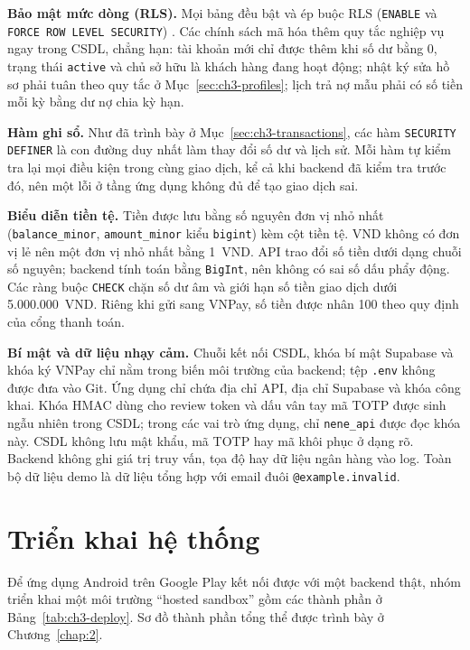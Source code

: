 \textbf{Bảo mật mức dòng (RLS).} Mọi bảng đều bật và ép buộc RLS (\texttt{ENABLE} và \texttt{FORCE ROW LEVEL SECURITY}) \parencite{ch2-pg-rls}. Các chính sách mã hóa thêm quy tắc nghiệp vụ ngay trong CSDL, chẳng hạn: tài khoản mới chỉ được thêm khi số dư bằng 0, trạng thái \texttt{active} và chủ sở hữu là khách hàng đang hoạt động; nhật ký sửa hồ sơ phải tuân theo quy tắc ở Mục~\ref{sec:ch3-profiles}; lịch trả nợ mẫu phải có số tiền mỗi kỳ bằng dư nợ chia kỳ hạn.

\textbf{Hàm ghi sổ.} Như đã trình bày ở Mục~\ref{sec:ch3-transactions}, các hàm \texttt{SECURITY DEFINER} là con đường duy nhất làm thay đổi số dư và lịch sử. Mỗi hàm tự kiểm tra lại mọi điều kiện trong cùng giao dịch, kể cả khi backend đã kiểm tra trước đó, nên một lỗi ở tầng ứng dụng không đủ để tạo giao dịch sai.

\textbf{Biểu diễn tiền tệ.} Tiền được lưu bằng số nguyên đơn vị nhỏ nhất (\texttt{balance\_\allowbreak{}minor}, \texttt{amount\_\allowbreak{}minor} kiểu \texttt{bigint}) kèm cột tiền tệ. VND không có đơn vị lẻ nên một đơn vị nhỏ nhất bằng 1~VND. API trao đổi số tiền dưới dạng chuỗi số nguyên; backend tính toán bằng \texttt{BigInt}, nên không có sai số dấu phẩy động. Các ràng buộc \texttt{CHECK} chặn số dư âm và giới hạn số tiền giao dịch dưới 5.000.000~VND. Riêng khi gửi sang VNPay, số tiền được nhân 100 theo quy định của cổng thanh toán.

\textbf{Bí mật và dữ liệu nhạy cảm.} Chuỗi kết nối CSDL, khóa bí mật Supabase và khóa ký VNPay chỉ nằm trong biến môi trường của backend; tệp \texttt{.\allowbreak{}env} không được đưa vào Git. Ứng dụng chỉ chứa địa chỉ API, địa chỉ Supabase và khóa công khai. Khóa HMAC dùng cho review token và dấu vân tay mã TOTP được sinh ngẫu nhiên trong CSDL; trong các vai trò ứng dụng, chỉ \texttt{nene\_\allowbreak{}api} được đọc khóa này. CSDL không lưu mật khẩu, mã TOTP hay mã khôi phục ở dạng rõ. Backend không ghi giá trị truy vấn, tọa độ hay dữ liệu ngân hàng vào log. Toàn bộ dữ liệu demo là dữ liệu tổng hợp với email đuôi \texttt{@example.\allowbreak{}invalid}.

\section{Triển khai hệ thống}
\label{sec:ch3-deploy}

Để ứng dụng Android trên Google Play kết nối được với một backend thật, nhóm triển khai một môi trường ``hosted sandbox'' gồm các thành phần ở Bảng~\ref{tab:ch3-deploy}. Sơ đồ thành phần tổng thể được trình bày ở Chương~\ref{chap:2}.


